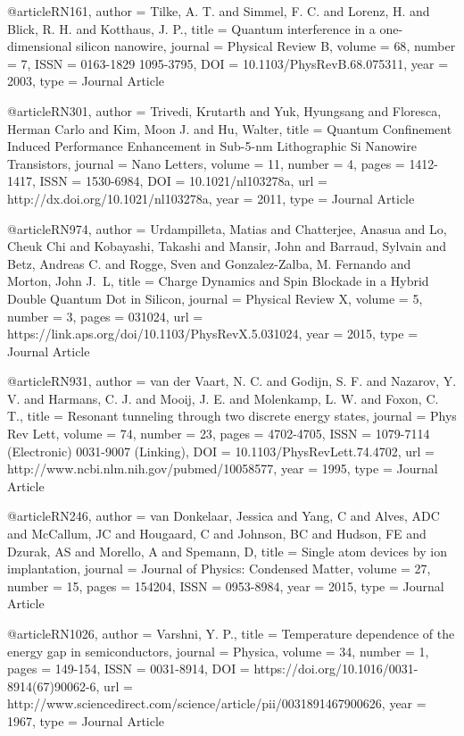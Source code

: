 @article{RN161,
   author = {Tilke, A. T. and Simmel, F. C. and Lorenz, H. and Blick, R. H. and Kotthaus, J. P.},
   title = {Quantum interference in a one-dimensional silicon nanowire},
   journal = {Physical Review B},
   volume = {68},
   number = {7},
   ISSN = {0163-1829
1095-3795},
   DOI = {10.1103/PhysRevB.68.075311},
   year = {2003},
   type = {Journal Article}
}

@article{RN301,
   author = {Trivedi, Krutarth and Yuk, Hyungsang and Floresca, Herman Carlo and Kim, Moon J. and Hu, Walter},
   title = {Quantum Confinement Induced Performance Enhancement in Sub-5-nm Lithographic Si Nanowire Transistors},
   journal = {Nano Letters},
   volume = {11},
   number = {4},
   pages = {1412-1417},
   ISSN = {1530-6984},
   DOI = {10.1021/nl103278a},
   url = {http://dx.doi.org/10.1021/nl103278a},
   year = {2011},
   type = {Journal Article}
}

@article{RN974,
   author = {Urdampilleta, Matias and Chatterjee, Anasua and Lo, Cheuk Chi and Kobayashi, Takashi and Mansir, John and Barraud, Sylvain and Betz, Andreas C. and Rogge, Sven and Gonzalez-Zalba, M. Fernando and Morton, John J.  L},
   title = {Charge Dynamics and Spin Blockade in a Hybrid Double Quantum Dot in Silicon},
   journal = {Physical Review X},
   volume = {5},
   number = {3},
   pages = {031024},
   url = {https://link.aps.org/doi/10.1103/PhysRevX.5.031024},
   year = {2015},
   type = {Journal Article}
}

@article{RN931,
   author = {van der Vaart, N. C. and Godijn, S. F. and Nazarov, Y. V. and Harmans, C. J. and Mooij, J. E. and Molenkamp, L. W. and Foxon, C. T.},
   title = {Resonant tunneling through two discrete energy states},
   journal = {Phys Rev Lett},
   volume = {74},
   number = {23},
   pages = {4702-4705},
   ISSN = {1079-7114 (Electronic)
0031-9007 (Linking)},
   DOI = {10.1103/PhysRevLett.74.4702},
   url = {http://www.ncbi.nlm.nih.gov/pubmed/10058577},
   year = {1995},
   type = {Journal Article}
}

@article{RN246,
   author = {van Donkelaar, Jessica and Yang, C and Alves, ADC and McCallum, JC and Hougaard, C and Johnson, BC and Hudson, FE and Dzurak, AS and Morello, A and Spemann, D},
   title = {Single atom devices by ion implantation},
   journal = {Journal of Physics: Condensed Matter},
   volume = {27},
   number = {15},
   pages = {154204},
   ISSN = {0953-8984},
   year = {2015},
   type = {Journal Article}
}

@article{RN1026,
   author = {Varshni, Y. P.},
   title = {Temperature dependence of the energy gap in semiconductors},
   journal = {Physica},
   volume = {34},
   number = {1},
   pages = {149-154},
   ISSN = {0031-8914},
   DOI = {https://doi.org/10.1016/0031-8914(67)90062-6},
   url = {http://www.sciencedirect.com/science/article/pii/0031891467900626},
   year = {1967},
   type = {Journal Article}
}

